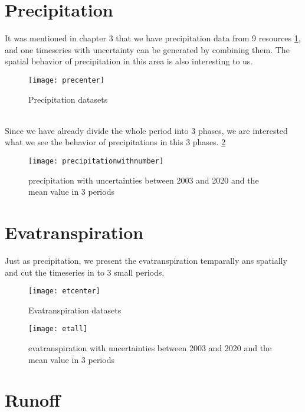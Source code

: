 \section{Precipitation}
It was mentioned in chapter 3 that we have precipitation data from 9 resources \ref{fig:precenter}, and one timeseries with uncertainty can be generated by combining them. The spatial behavior of precipitation in this area is also interesting to us. 
\begin{figure}[htbp]
	\centering
	\texttt{[image: precenter]} %
	\caption{Precipitation datasets} 
	\label{fig:precenter}
\end{figure}
\\
Since we have already divide the whole period into 3 phases, we are interested what we see the behavior of precipitations in this 3 phases. \ref{fig:allpre}
\begin{figure}[htbp]
	\centering
	\texttt{[image: precipitationwithnumber]} %
	\caption{precipitation with uncertainties between 2003 and 2020 and the mean value in 3 periods} 
	\label{fig:allpre}
\end{figure}
\section{Evatranspiration}
Just as precipitation, we present the evatranspiration temparally ans spatially and cut the timeseries in to 3 small periods.
\begin{figure}[htbp]
	\centering
	\texttt{[image: etcenter]} %
	\caption{Evatranspiration datasets} 
	\label{fig:etcenter}
\end{figure}
\begin{figure}[htbp]
	\centering
	\texttt{[image: etall]} %
	\caption{evatranspiration with uncertainties between 2003 and 2020 and the mean value in 3 periods} 
	\label{fig:etall}
\end{figure}
\clearpage
\section{Runoff}
